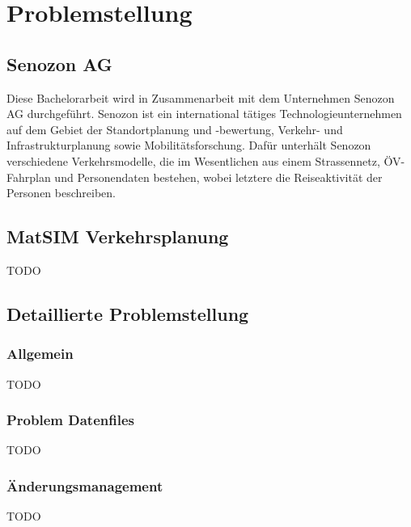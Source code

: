 \chapter{Problemstellung}

\section{Senozon AG}
\begin{flushleft}
Diese Bachelorarbeit wird in Zusammenarbeit mit dem Unternehmen Senozon AG durchgeführt.
Senozon ist ein international tätiges Technologieunternehmen auf dem Gebiet der Standortplanung und -bewertung, Verkehr- und Infrastrukturplanung sowie Mobilitätsforschung. Dafür unterhält Senozon verschiedene Verkehrsmodelle, die im Wesentlichen aus einem Strassennetz, ÖV-Fahrplan und Personendaten bestehen, wobei letztere die Reiseaktivität der Personen beschreiben.
\end{flushleft}
\section{MatSIM Verkehrsplanung}
\begin{flushleft}
TODO
\end{flushleft}
\section{Detaillierte Problemstellung}
\subsection{Allgemein}
\begin{flushleft}
TODO
\end{flushleft}
\subsection{Problem Datenfiles}
\begin{flushleft}
TODO
\end{flushleft}
\subsection{Änderungsmanagement}
\begin{flushleft}
TODO
\end{flushleft}



